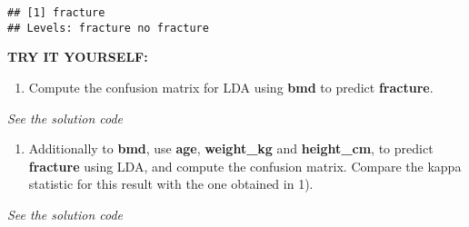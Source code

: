 \documentclass[
]{book}
\newenvironment{Shaded}{\begin{snugshade}}{\end{snugshade}}
\newcommand{\AttributeTok}[1]{\textcolor[rgb]{0.13,0.29,0.53}{#1}}
\newcommand{\CommentTok}[1]{\textcolor[rgb]{0.56,0.35,0.01}{\textit{#1}}}
\newcommand{\FunctionTok}[1]{\textcolor[rgb]{0.13,0.29,0.53}{\textbf{#1}}}
\newcommand{\NormalTok}[1]{#1}
\newcommand{\OtherTok}[1]{\textcolor[rgb]{0.56,0.35,0.01}{#1}}
\newcommand{\SpecialCharTok}[1]{\textcolor[rgb]{0.81,0.36,0.00}{\textbf{#1}}}
\providecommand{\tightlist}{%
  \setlength{\itemsep}{0pt}\setlength{\parskip}{0pt}}
\begin{document}
\begin{verbatim}
## [1] fracture
## Levels: fracture no fracture
\end{verbatim}

\textbf{TRY IT YOURSELF:}

\begin{enumerate}
\def\labelenumi{\arabic{enumi})}
\tightlist
\item
  Compute the confusion matrix for LDA using \textbf{bmd} to
  predict \textbf{fracture}.
\end{enumerate}

\emph{See the solution code}

\begin{Shaded}
\end{Shaded}

\begin{enumerate}
\def\labelenumi{\arabic{enumi})}
\setcounter{enumi}{1}
\tightlist
\item
  Additionally to \textbf{bmd}, use \textbf{age}, \textbf{weight\_kg} and \textbf{height\_cm}, to
  predict \textbf{fracture} using LDA, and compute the confusion matrix. Compare the
  kappa statistic for this result with the one obtained in 1).
\end{enumerate}

\emph{See the solution code}

\begin{Shaded}
\end{Shaded}
\end{document}
